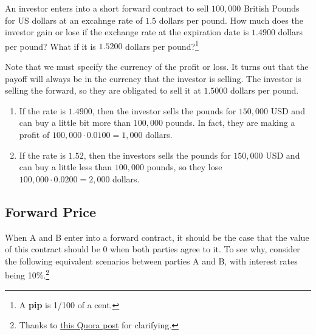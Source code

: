 \documentclass{article}
\begin{document}
      \begin{exercise}[Hull 1.5]
        An investor enters into a short forward contract to sell $100,000$ British Pounds for US dollars at an excahnge rate of $1.5$ dollars per pound. How much does the investor gain or lose if the exchange rate at the expiration date is $1.4900$ dollars per pound? What if it is $1.5200$ dollars per pound?\footnote{A \textbf{pip} is 1/100 of a cent.}
      \end{exercise}
      \begin{solution}
        Note that we must specify the currency of the profit or loss. It turns out that the payoff will always be in the currency that the investor is selling. The investor is selling the forward, so they are obligated to sell it at $1.5000$ dollars per pound. 
        \begin{enumerate}
          \item If the rate is $1.4900$, then the investor sells the pounds for $150,000$ USD and can buy a little bit more than $100,000$ pounds. In fact, they are making a profit of $100,000 \cdot 0.0100 = 1,000$ dollars.
          \item If the rate is $1.52$, then the investors sells the pounds for $150,000$ USD and can buy a little less than $100,000$ pounds, so they lose $100,000 \cdot 0.0200 = 2,000$ dollars. 
        \end{enumerate}
      \end{solution}

  \subsection{Forward Price}

    When A and B enter into a forward contract, it should be the case that the value of this contract should be $0$ when both parties agree to it. To see why, consider the following equivalent scenarios between parties A and B, with interest rates being 10\%.\footnote{Thanks to \href{https://www.quora.com/Why-is-the-initial-value-of-a-forward-contract-set-to-zero}{this Quora post} for clarifying. } 
\end{document}
